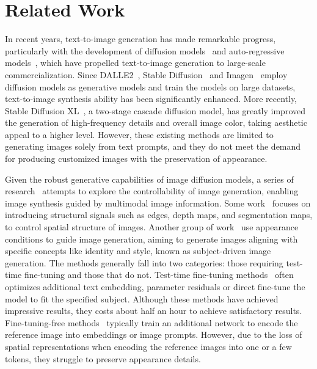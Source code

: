 \section{Related Work}

In recent years, text-to-image generation has made remarkable progress, particularly with the development of diffusion models~\cite{ramesh2022dalle2, nichol2022glide, rombach2022ldm, saharia2022imagen, dhariwal2021diffusionbeatgans, ho2020ddpm, podell2023sdxl} and auto-regressive
models~\cite{chang2023muse, yu2022scalingauto, tian2024var}, which have propelled text-to-image generation to large-scale commercialization. Since DALLE2~\cite{ramesh2022dalle2}, Stable Diffusion~\cite{rombach2022ldm} and Imagen~\cite{saharia2022imagen} employ diffusion models as generative models and train the models on large datasets, text-to-image synthesis ability has been significantly enhanced. More recently, Stable Diffusion XL~\cite{podell2023sdxl}, a two-stage cascade diffusion model, has greatly improved the generation of high-frequency details and overall image color, taking aesthetic appeal to a higher level. However, these existing methods are limited to generating images solely from text prompts, and they do not meet the demand for producing customized images with the preservation of appearance.

Given the robust generative capabilities of image diffusion models, a series of research~\cite{zhang2023controlnet, mou2023t2iadapter, qin2023unicontrol, ruiz2023dreambooth, hu2021lora, ye2023ipadapter, chen2023anydoor, zhang2024ssrencoder} attempts to explore the controllability of image generation, enabling image synthesis guided by multimodal image information. Some work~\cite{zhang2023controlnet, mou2023t2iadapter, jiang2023scedit, qin2023unicontrol, zhao2024unicontrolnet, hu2023cocktail} focuses on introducing structural signals such as edges, depth maps, and segmentation maps, to control spatial structure of images. Another group of work~\cite{ruiz2023dreambooth, hu2021lora, gal2022textualinversion, ye2023ipadapter, chen2023anydoor} use appearance conditions to guide image generation, aiming to generate images aligning with specific concepts like identity and style, known as subject-driven image generation. The methods generally fall into two categories: those requiring test-time fine-tuning and those that do not. Test-time fine-tuning methods~\cite{ruiz2023dreambooth, hu2021lora, gal2022textualinversion, kumari2023customdiffusion, liu2023cones} often optimizes additional text embedding, parameter residuals or direct fine-tune the model to fit the specified subject. Although these methods have achieved impressive results, they costs about half an hour to achieve satisfactory results. Fine-tuning-free methods~\cite{shi2023instantbooth, ye2023ipadapter, chen2023anydoor, zhang2024ssrencoder, ma2023subjectdiffusion, gal2023encoderdiff, wei2023elite} typically train an additional network to encode the reference image into embeddings or image prompts. However, due to the loss of spatial representations when encoding the reference images into one or a few tokens, they struggle to preserve appearance details.

